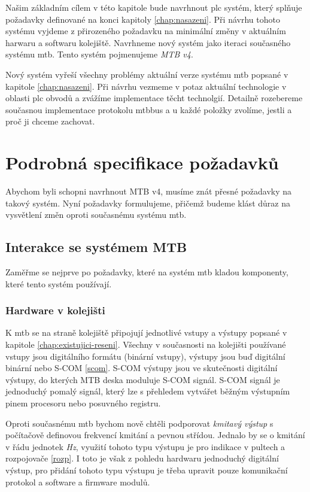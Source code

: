 Našim základním cílem v této kapitole bude navrhnout \gls{plc} systém, který
splňuje požadavky definované na konci kapitoly \ref{chap:nasazeni}. Při návrhu
tohoto systému vyjdeme z přirozeného požadavku na minimální změny v aktuálním
harwaru a softwaru kolejiště. Navrhneme nový systém jako iteraci současného
systému \gls{mtb}. Tento systém pojmenujeme \textit{MTB v4}.

Nový systém vyřeší všechny problémy aktuální verze systému \gls{mtb} popsané
v kapitole \ref{chap:nasazeni}. Při návrhu vezmeme v potaz aktuální technologie
v oblasti \gls{plc} obvodů a zvážíme implementace těcht technolgií. Detailně
rozebereme současnou implementace protokolu \gls{mtbbus} a u každé položky
zvolíme, jestli a proč ji chceme zachovat.

\section{Podrobná specifikace požadavků}

Abychom byli schopni navrhnout MTB v4, musíme znát přesné požadavky na takový
systém. Nyní požadavky formulujeme, přičemž budeme klást důraz na vysvětlení
změn oproti současnému systému \gls{mtb}.

\subsection{Interakce se systémem MTB}

Zaměřme se nejprve po požadavky, které na systém \gls{mtb} kladou komponenty,
které tento systém používají.

\subsubsection{Hardware v kolejišti}

K \gls{mtb} se na straně kolejiště připojují jednotlivé vstupy a výstupy
popsané v kapitole \ref{chap:existujici-reseni}. Všechny v současnosti na
kolejišti používané vstupy jsou digitálního formátu (binární vstupy), výstupy
jsou buď digitální binární nebo S-COM \ref{scom}. S-COM výstupy jsou ve
skutečnosti digitální výstupy, do kterých MTB deska moduluje S-COM signál.
S-COM signál je jednoduchý pomalý signál, který lze s přehledem vytvářet běžným
výstupním pinem procesoru nebo posuvného registru.

Oproti současnému \gls{mtb} bychom nově chtěli podporovat \textit{kmitavý
výstup} s počítačově definovou frekvencí kmitání a pevnou střídou. Jednalo by
se o kmitání v řádu jednotek \textit{Hz}, využití tohoto typu výstupu je pro
indikace v pultech a rozpojovače \ref{rozp}. I toto je však z pohledu hardwaru
jednoduchý digitální výstup, pro přidání tohoto typu výstupu je třeba upravit
pouze komunikační protokol a software a firmware modulů.

